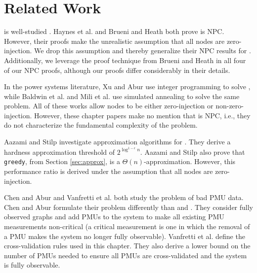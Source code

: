 \section{Related Work}
\label{sec:related-pmu}

\full is well-studied \cite{Baldwin93,Brueni05,Haynes02, Mili90, Xu04}.  
Haynes et al. \cite{Haynes02} and Brueni and Heath \cite{Brueni05} both prove \full is NPC.  
However, their proofs make the unrealistic assumption that all nodes are zero-injection.  We drop this assumption and thereby generalize their NPC results for \fulls.
Additionally, we leverage the proof technique from Brueni and Heath \cite{Brueni05} in all four of our NPC proofs, although our proofs
differ considerably in their details. 

In the power systems literature, Xu and Abur \cite{Xu04,Xu05} use integer programming to solve \fulls, while Baldwin et al. \cite{Baldwin93} and Mili et al. \cite{Mili90} use simulated annealing 
to solve the same problem. All of these works allow nodes to be either zero-injection or non-zero-injection.  However,
these chapter papers make no mention that \full is NPC, i.e., they do not characterize the fundamental complexity of the problem. 

Aazami and Stilp \cite{Aazami07} investigate approximation algorithms for \fulls.  They derive a hardness approximation threshold of $2^{\log^{1 -\epsilon}n}$.
Aazami and Stilp also prove that {\tt greedy}, from Section \ref{sec:approx}, is a $\Theta(n)$-approximation. 
However, this performance ratio is derived under the assumption that all nodes are zero-injection.

Chen and Abur \cite{Abur06} and Vanfretti et al. \cite{Vanfretti10} both study the problem of bad PMU data. Chen and Abur \cite{Abur06} formulate their problem differently than \xval and \xvalparts.  
They consider fully observed graphs and add PMUs to the system to make all existing PMU measurements non-critical 
(a critical measurement is one in which the removal of a PMU makes the system
no longer fully observable). Vanfretti et al. \cite{Vanfretti10} define the cross-validation rules used in this chapter.  They also derive a
lower bound on the number of PMUs needed to ensure all PMUs are cross-validated and the system is fully observable. 

